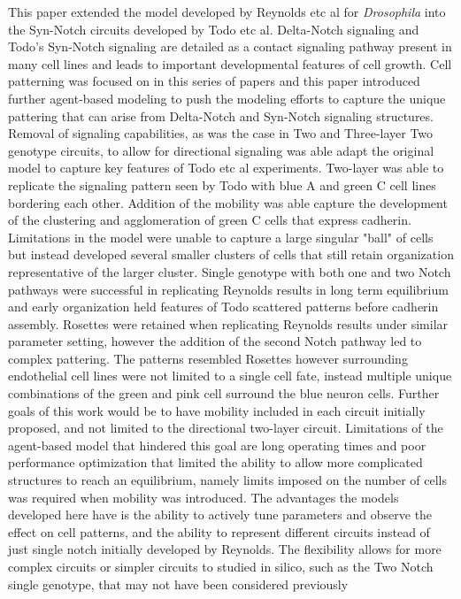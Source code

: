 \documentclass[12pt]{ifacconf}
\begin{document}
This paper extended the model developed by Reynolds etc al for \emph{Drosophila} into the Syn-Notch circuits developed by Todo etc al. Delta-Notch signaling and Todo's Syn-Notch signaling are detailed as a contact signaling pathway present in many cell lines and leads to important developmental features of cell growth. Cell patterning was focused on in this series of papers and this paper introduced further agent-based modeling to push the modeling efforts to capture the unique pattering that can arise from Delta-Notch and Syn-Notch signaling structures. Removal of signaling capabilities, as was the case in Two and Three-layer Two genotype circuits, to allow for directional signaling was able adapt the original model to capture key features of Todo etc al experiments. Two-layer was able to replicate the signaling pattern seen by Todo with blue A and green C cell lines bordering each other. Addition of the mobility was able capture the development of the clustering and agglomeration of green C cells that express cadherin. Limitations in the model were unable to capture a large singular "ball" of cells but instead developed several smaller clusters of cells that still retain organization representative of the larger cluster. Single genotype with both one and two Notch pathways were successful in replicating Reynolds results in long term equilibrium and early organization held features of Todo scattered patterns before cadherin assembly. Rosettes were retained when replicating Reynolds results under similar parameter setting, however the addition of the second Notch pathway led to complex pattering. The patterns resembled Rosettes however surrounding endothelial cell lines were not limited to a single cell fate, instead multiple unique combinations of the green and pink cell surround the blue neuron cells. Further goals of this work would be to have mobility included in each circuit initially proposed, and not limited to the directional two-layer circuit. Limitations of the agent-based model that hindered this goal are long operating times and poor performance optimization that limited the ability to allow more complicated structures to reach an equilibrium, namely limits imposed on the number of cells was required when mobility was introduced. The advantages the models developed here have is the ability to actively tune parameters and observe the effect on cell patterns, and the ability to represent different circuits instead of just single notch initially developed by Reynolds. The flexibility allows for more complex circuits or simpler circuits to studied in silico, such as the Two Notch single genotype, that may not have been considered previously
\end{document}
